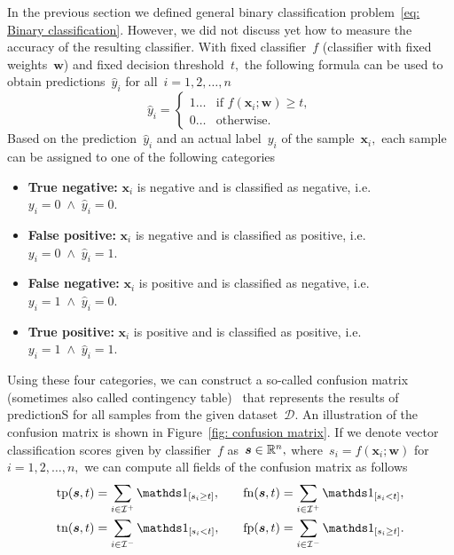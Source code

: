 In the previous section we defined general binary classification problem~\ref{eq: Binary classification}. However, we did not discuss yet how to measure the accuracy of the resulting classifier. With fixed classifier~$f$ (classifier with fixed weights~$\bm{w}$) and fixed decision threshold~$t,$ the following formula can be used to obtain predictions~$\hat{y}_i$ for all~$i = 1, 2, \ldots, n$
\begin{equation*}
  \hat{y}_i = \begin{cases}
    1 \ldots & \text{if } f(\bm{x}_i; \bm{w}) \ge t, \\
    0 \ldots & \text{otherwise.}
  \end{cases}
\end{equation*}
Based on the prediction~$\hat{y}_i$ and an actual label~$y_i$ of the sample~$\bm{x}_i,$ each sample can be assigned to one of the following categories
\begin{itemize}
  \item \textbf{True negative:} $\bm{x}_i$ is negative and is classified as negative, i.e.~$y_i = 0 \; \land \; \hat{y}_i = 0.$
  \item \textbf{False positive:} $\bm{x}_i$ is negative and is classified as positive, i.e.~$y_i = 0 \; \land \; \hat{y}_i = 1.$
  \item \textbf{False negative:} $\bm{x}_i$ is positive and is classified as negative, i.e.~$y_i = 1 \; \land \; \hat{y}_i = 0.$
  \item \textbf{True positive:} $\bm{x}_i$ is positive and is classified as positive, i.e.~$y_i = 1 \; \land \; \hat{y}_i = 1.$
\end{itemize}
Using these four categories, we can construct a so-called confusion matrix (sometimes also called contingency table)~\cite{fawcett2006introduction} that represents the results of predictionS for all samples from the given dataset~$\mathcal{D}$. An illustration of the confusion matrix is shown in Figure~\ref{fig: confusion matrix}. If we denote vector classification scores given by classifier~$f$ as~$\bm{s} \in \mathbb{R}^n,$ where~$s_i = f(\bm{x}_i; \bm{w})$ for~$i = 1, 2, \ldots, n,$ we can compute all fields of the confusion matrix as follows
\begin{equation}\label{eq: c counts}
  \begin{aligned}
    \tp(\bm{s}, t) & = \sum_{i \in \I^+}\Iverson{s_i \ge t}, & \quad
    \fn(\bm{s}, t) & = \sum_{i \in \I^+}\Iverson{s_i < t}, \\
    \tn(\bm{s}, t) & = \sum_{i \in \I^-}\Iverson{s_i < t}, & \quad
    \fp(\bm{s}, t) & = \sum_{i \in \I^-}\Iverson{s_i \ge t}.
  \end{aligned}
\end{equation}
